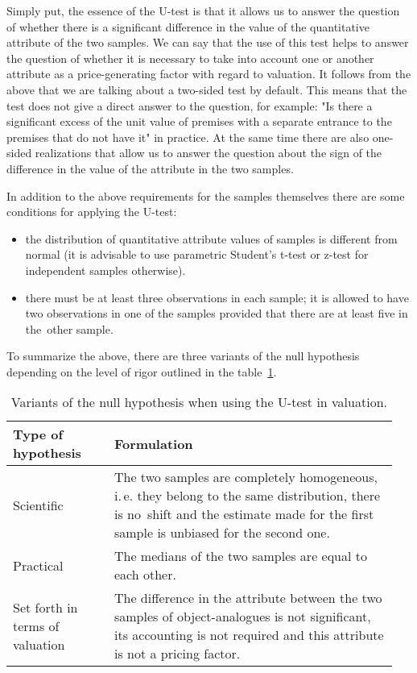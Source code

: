 \documentclass[]{scrreprt}
\begin{document}
Simply put, the essence of the U-test is that it allows us to answer the question of whether there is a significant difference in the value of the quantitative attribute of the two samples. We can say that the use of this test helps to answer the question of whether it is necessary to take into account one or another attribute as a price-generating factor with regard to valuation. It follows from the above that we are talking about a two-sided test by default. This means that the test does not give a direct answer to the question, for example: "Is there a significant excess of the unit value of premises with a separate entrance to the premises that do not have it" in practice. At the same time there are also one-sided realizations that allow us to answer the question about the sign of the difference in the value of the attribute in the two samples.

In addition to the above requirements for the samples themselves there are some conditions for applying the U-test:
\begin{itemize}
	\item the distribution of quantitative attribute values of samples is different from normal (it is advisable to use parametric Student's t-test or z-test for independent samples otherwise).
	\item there must be at least three observations in each sample; it is allowed to have two observations in one of the samples provided that there are at least five in the~other sample.
\end{itemize}
To summarize the above, there are three variants of the null hypothesis depending on the level of rigor outlined in the table~\ref{tab:nul-hypothesis-variants}.
\begin{table}[htp]
	\caption{Variants of the null hypothesis when using the U-test in valuation.}\label{tab:nul-hypothesis-variants}
	\centering
	\begin{tabularx}{\textwidth}{p{0.25\linewidth} p{0.7\linewidth}} 
		\hline
		Type of hypothesis&Formulation\\
		\hline
		Scientific&The two samples are completely homogeneous, i.\,e. they belong to the same distribution, there is no~shift and the estimate made for the first sample is unbiased for the second one.\\
		\hline
		Practical&The medians of the two samples are equal to each other.\\
		\hline
		Set forth in terms of valuation&The difference in the attribute between the two samples of object-analogues is not significant, its accounting is not required and this attribute is not a pricing factor.\\
		\hline
	\end{tabularx}
\end{table}
%
\end{document}

